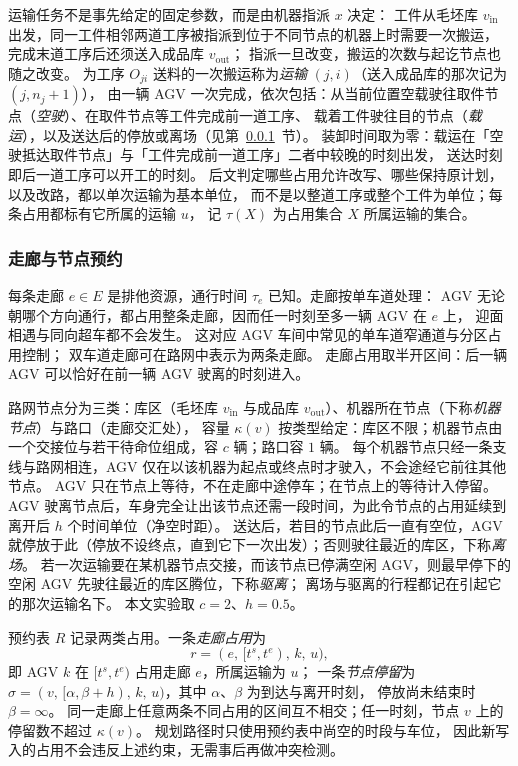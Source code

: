 \documentclass[manuscript,screen,review]{acmart}
\begin{document}
运输任务不是事先给定的固定参数，而是由机器指派 \(x\) 决定：
工件从毛坯库 \(v_{\mathrm{in}}\) 出发，同一工件相邻两道工序被指派到位于不同节点的机器上时需要一次搬运，
完成末道工序后还须送入成品库 \(v_{\mathrm{out}}\)；
指派一旦改变，搬运的次数与起讫节点也随之改变。
为工序 \(O_{ji}\) 送料的一次搬运称为\emph{运输} \((j,i)\)（送入成品库的那次记为 \((j,n_j+1)\)），
由一辆 AGV 一次完成，依次包括：从当前位置空载驶往取件节点（\emph{空驶}）、在取件节点等工件完成前一道工序、
载着工件驶往目的节点（\emph{载运}），以及送达后的停放或离场（见第~\ref{sec:reservation}~节）。
装卸时间取为零：载运在「空驶抵达取件节点」与「工件完成前一道工序」二者中较晚的时刻出发，
送达时刻即后一道工序可以开工的时刻。
后文判定哪些占用允许改写、哪些保持原计划，以及改路，都以单次运输为基本单位，
而不是以整道工序或整个工件为单位；每条占用都标有它所属的运输 \(u\)，
记 \(\tau(X)\) 为占用集合 \(X\) 所属运输的集合。

\subsubsection{走廊与节点预约}
\label{sec:reservation}

每条走廊 \(e\in E\) 是排他资源，通行时间 \(\tau_e\) 已知。走廊按单车道处理：
AGV 无论朝哪个方向通行，都占用整条走廊，因而任一时刻至多一辆 AGV 在 \(e\) 上，
迎面相遇与同向超车都不会发生。
这对应 AGV 车间中常见的单车道窄通道与分区占用控制；
双车道走廊可在路网中表示为两条走廊。
走廊占用取半开区间：后一辆 AGV 可以恰好在前一辆 AGV 驶离的时刻进入。

路网节点分为三类：库区（毛坯库 \(v_{\mathrm{in}}\) 与成品库 \(v_{\mathrm{out}}\)）、机器所在节点（下称\emph{机器节点}）与路口（走廊交汇处），
容量 \(\kappa(v)\) 按类型给定：库区不限；机器节点由一个交接位与若干待命位组成，容 \(c\) 辆；路口容 \(1\) 辆。
每个机器节点只经一条支线与路网相连，AGV 仅在以该机器为起点或终点时才驶入，不会途经它前往其他节点。
AGV 只在节点上等待，不在走廊中途停车；在节点上的等待计入停留。
AGV 驶离节点后，车身完全让出该节点还需一段时间，为此令节点的占用延续到离开后 \(h\) 个时间单位（净空时距）。
送达后，若目的节点此后一直有空位，AGV 就停放于此（停放不设终点，直到它下一次出发）；否则驶往最近的库区，下称\emph{离场}。
若一次运输要在某机器节点交接，而该节点已停满空闲 AGV，则最早停下的空闲 AGV 先驶往最近的库区腾位，下称\emph{驱离}；
离场与驱离的行程都记在引起它的那次运输名下。
本文实验取 \(c=2\)、\(h=0.5\)。

预约表 \(R\) 记录两类占用。一条\emph{走廊占用}为
\[
r=(e,\,[t^s,t^e),\,k,\,u),
\]
即 AGV \(k\) 在 \([t^s,t^e)\) 占用走廊 \(e\)，所属运输为 \(u\)；
一条\emph{节点停留}为 \(\sigma=(v,\,[\alpha,\beta+h),\,k,\,u)\)，其中 \(\alpha\)、\(\beta\) 为到达与离开时刻，
停放尚未结束时 \(\beta=\infty\)。
同一走廊上任意两条不同占用的区间互不相交；任一时刻，节点 \(v\) 上的停留数不超过 \(\kappa(v)\)。
规划路径时只使用预约表中尚空的时段与车位，
因此新写入的占用不会违反上述约束，无需事后再做冲突检测。
\end{document}
